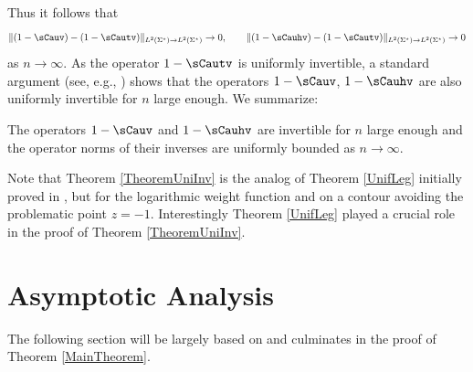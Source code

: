 Thus it follows that
\begin{align*}
 \Vert (1-\sCauv) - (1-\sCautv) \Vert_{L^2(\Sigma^\star) \to L^2(\Sigma^\star)} \to 0,
 \qquad
 \Vert (1-\sCauhv) - (1-\sCautv) \Vert_{L^2(\Sigma^\star) \to L^2(\Sigma^\star)} \to 0
\end{align*}
as $n \to \infty$. As the operator $1-\sCautv$ is uniformly invertible, a standard argument (see, e.g., \cite[Theorem~4.7]{CD}) shows that the operators $1-\sCauv$, $1-\sCauhv$ are also uniformly invertible for $n$ large enough. We summarize:
\begin{Theorem}\label{TheoremUniInv}
The operators $1-\sCauv$ and $1-\sCauhv$ are invertible for $n$ large enough and the operator norms of their inverses are uniformly bounded as $n \to \infty$.
\end{Theorem}
Note that Theorem \ref{TheoremUniInv} is the analog of Theorem \ref{UnifLeg} initially proved in \cite[Theorem~4.5]{CD}, but for the logarithmic weight function and on a contour avoiding the problematic point $z = -1$. Interestingly Theorem \ref{UnifLeg} played a crucial role in the proof of Theorem \ref{TheoremUniInv}.

\section{Asymptotic Analysis}
\label{SectAsymptoticAnalysis}
The following section will be largely based on \cite[Section~5]{CD} and culminates in the proof of Theorem \ref{MainTheorem}.

